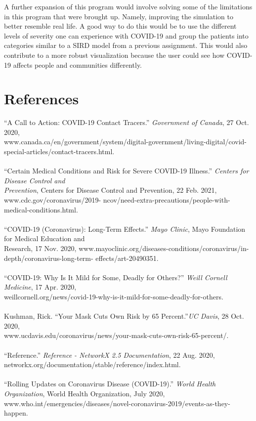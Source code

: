 \documentclass[fontsize=11pt]{article}
\begin{document}
    A further expansion of this program would involve solving some of the limitations in this program that were brought up. Namely, improving the simulation to better resemble real life. A good way to do this would be to use the different levels of severity one can experience with COVID-19 and group the patients into categories similar to a SIRD model from a previous assignment. This would also contribute to a more robust visualization because the user could see how COVID-19 affects people and communities differently.
    \newpage
    \section*{References}
    “A Call to Action: COVID-19 Contact Tracers.” \textit{Government of Canada}, 27 Oct. 2020,\\
    \indent www.canada.ca/en/government/system/digital-government/living-digital/covid-special-articles/contact-tracers.html.
    \\ \\
    “Certain Medical Conditions and Risk for Severe COVID-19 Illness.” \textit{Centers for Disease Control and}  \\
    \indent \textit{Prevention}, Centers for Disease Control and Prevention, 22 Feb. 2021, www.cdc.gov/coronavirus/2019-
    \indent ncov/need-extra-precautions/people-with-medical-conditions.html. \\ \\
    “COVID-19 (Coronavirus): Long-Term Effects.” \textit{Mayo Clinic}, Mayo Foundation for Medical Education and \\
    \indent Research, 17 Nov. 2020, www.mayoclinic.org/diseases-conditions/coronavirus/in-depth/coronavirus-long-term-
    \indent effects/art-20490351.
    \\ \\
    “COVID-19: Why Is It Mild for Some, Deadly for Others?” \textit{Weill Cornell Medicine}, 17 Apr. 2020, \\
    \indent weillcornell.org/news/covid-19-why-is-it-mild-for-some-deadly-for-others.
    \\ \\
    Kushman, Rick. “Your Mask Cuts Own Risk by 65 Percent.”\textit{UC Davis}, 28 Oct. 2020, \\
    \indent www.ucdavis.edu/coronavirus/news/your-mask-cuts-own-risk-65-percent/.
    \\ \\
    “Reference.” \textit{Reference - NetworkX 2.5 Documentation}, 22 Aug. 2020, \\
    \indent networkx.org/documentation/stable/reference/index.html.
    \\ \\
    “Rolling Updates on Coronavirus Disease (COVID-19).” \textit{World Health Organization}, World Health Organization,
     July 2020, www.who.int/emergencies/diseases/novel-coronavirus-2019/events-as-they-happen.
\end{document}
